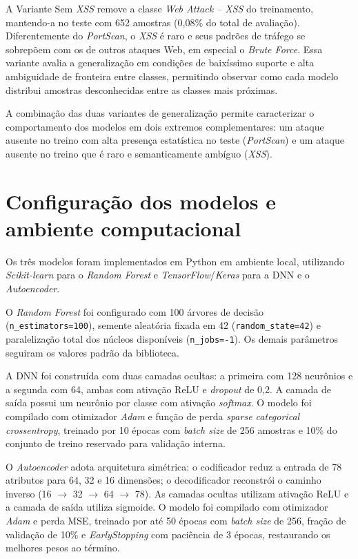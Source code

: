 A Variante Sem \textit{XSS} remove a classe \textit{Web Attack -- XSS} do treinamento, mantendo-a no teste com 652 amostras (0,08\% do total de avaliação). Diferentemente do \textit{PortScan}, o \textit{XSS} é raro e seus padrões de tráfego se sobrepõem com os de outros ataques Web, em especial o \textit{Brute Force}. Essa variante avalia a generalização em condições de baixíssimo suporte e alta ambiguidade de fronteira entre classes, permitindo observar como cada modelo distribui amostras desconhecidas entre as classes mais próximas.

A combinação das duas variantes de generalização permite caracterizar o comportamento dos modelos em dois extremos complementares: um ataque ausente no treino com alta presença estatística no teste (\textit{PortScan}) e um ataque ausente no treino que é raro e semanticamente ambíguo (\textit{XSS}).

\section{Configuração dos modelos e ambiente computacional}

Os três modelos foram implementados em Python em ambiente local, utilizando \textit{Scikit-learn} para o \textit{Random Forest} e \textit{TensorFlow}/\textit{Keras} para a DNN e o \textit{Autoencoder}.

O \textit{Random Forest} foi configurado com 100 árvores de decisão (\texttt{n\_estimators=100}), semente aleatória fixada em 42 (\texttt{random\_state=42}) e paralelização total dos núcleos disponíveis (\texttt{n\_jobs=-1}). Os demais parâmetros seguiram os valores padrão da biblioteca.

A DNN foi construída com duas camadas ocultas: a primeira com 128 neurônios e a segunda com 64, ambas com ativação ReLU e \textit{dropout} de 0,2. A camada de saída possui um neurônio por classe com ativação \textit{softmax}. O modelo foi compilado com otimizador \textit{Adam} e função de perda \textit{sparse categorical crossentropy}, treinado por 10 épocas com \textit{batch size} de 256 amostras e 10\% do conjunto de treino reservado para validação interna.

O \textit{Autoencoder} adota arquitetura simétrica: o codificador reduz a entrada de 78 atributos para 64, 32 e 16 dimensões; o decodificador reconstrói o caminho inverso (16 $\to$ 32 $\to$ 64 $\to$ 78). As camadas ocultas utilizam ativação ReLU e a camada de saída utiliza sigmoide. O modelo foi compilado com otimizador \textit{Adam} e perda MSE, treinado por até 50 épocas com \textit{batch size} de 256, fração de validação de 10\% e \textit{EarlyStopping} com paciência de 3 épocas, restaurando os melhores pesos ao término.

